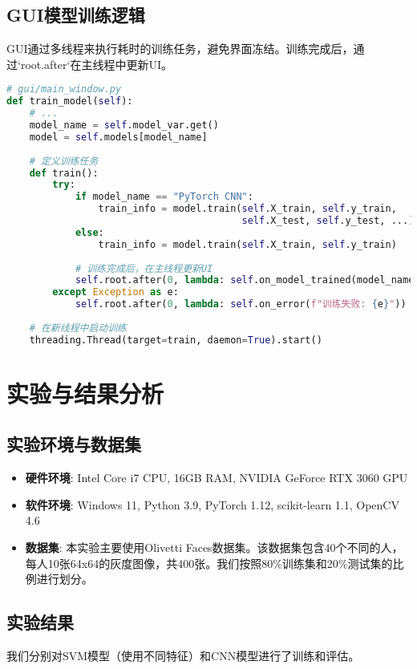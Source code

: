 \documentclass[a4paper]{article}
\begin{document}
\subsection{GUI模型训练逻辑}
GUI通过多线程来执行耗时的训练任务，避免界面冻结。训练完成后，通过`root.after`在主线程中更新UI。
\begin{lstlisting}[language=Python, caption={GUI中的异步模型训练}]
# gui/main_window.py
def train_model(self):
    # ...
    model_name = self.model_var.get()
    model = self.models[model_name]
    
    # 定义训练任务
    def train():
        try:
            if model_name == "PyTorch CNN":
                train_info = model.train(self.X_train, self.y_train, 
                                         self.X_test, self.y_test, ...)
            else:
                train_info = model.train(self.X_train, self.y_train)
            
            # 训练完成后，在主线程更新UI
            self.root.after(0, lambda: self.on_model_trained(model_name, train_info))
        except Exception as e:
            self.root.after(0, lambda: self.on_error(f"训练失败: {e}"))
    
    # 在新线程中启动训练
    threading.Thread(target=train, daemon=True).start()
\end{lstlisting}

\section{实验与结果分析}
\subsection{实验环境与数据集}
\begin{itemize}
    \item \textbf{硬件环境}: Intel Core i7 CPU, 16GB RAM, NVIDIA GeForce RTX 3060 GPU
    \item \textbf{软件环境}: Windows 11, Python 3.9, PyTorch 1.12, scikit-learn 1.1, OpenCV 4.6
    \item \textbf{数据集}: 本实验主要使用Olivetti Faces数据集。该数据集包含40个不同的人，每人10张64x64的灰度图像，共400张。我们按照80\%训练集和20\%测试集的比例进行划分。
\end{itemize}

\subsection{实验结果}
我们分别对SVM模型（使用不同特征）和CNN模型进行了训练和评估。
\end{document}
